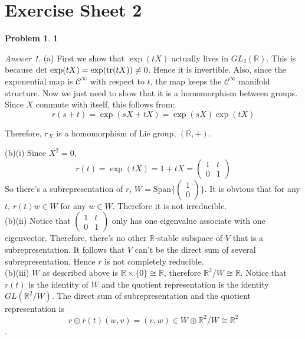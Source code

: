 \documentclass[10pt,a4paper]{article}
\theoremstyle{plain}
\theoremstyle{definition}
\newtheorem*{problem*}{Problem}
\theoremstyle{remark}
\newtheorem*{answer*}{Answer}
\newcommand{\sC}{\mathcal{C}}
\newcommand{\IR}{\mathbb{R}}
\newcommand{\tr}{\mathrm{tr}}
\renewcommand\det{{\rm det\,}}
\newcommand{\<}{\langle}
\renewcommand{\>}{\rangle}
\newcommand{\isom}{\cong}
\begin{document}
\section{Exercise Sheet 2}
\label{sec:Exercise Sheet 2}

\begin{problem*} \bfseries 1
\end{problem*}

\begin{answer*} \hfill

(a) First we show that $\exp(tX)$ actually lives in $GL_2(\IR)$. This is because $\det \exp(tX) = \exp(\tr(tX)) \not = 0$. Hence it is invertible. Also, since the exponential map is $\sC^\infty$ with respect to $t$, the map keeps the $\sC^\infty$ manifold structure. Now we just need to show that it is a homomorphism between groups.
Since $X$ commute with itself, this follows from:
\[r(s+t) = \exp(sX+tX) = \exp(sX)\exp(tX)\]

Therefore, $r_X$ is a homomorphism of Lie group, $(\IR, +)$. \\
\hfill

(b)(i) Since $X^2 = 0$, $$r(t) = \exp(tX) = 1+tX = \begin{pmatrix} 1 & t \\ 0 & 1\end{pmatrix}$$ So there's a subrepresentation of $r$, $W = \mathrm{Span}\{\begin{pmatrix}1\\0\end{pmatrix}\}$. It is obvious that for any $t$, $r(t)w\in W$ for any $w\in W$. Therefore it is not irreducible.\\

(b)(ii) Notice that $\begin{pmatrix} 1 & t \\ 0 & 1\end{pmatrix}$ only has one eigenvalue associate with one eigenvector. Therefore, there's no other $\IR$-stable subspace of $V$ that is a subrepresentation. It follows that $V$ can't be the direct sum of several subrepresentation. Hence $r$ is not completely reducible. \\

(b)(iii) $W$ as described above is $\IR\times\{0\} \cong \IR$, therefore $\IR^2/W \cong \IR$. Notice that $r(t)$ is the identity of $W$ and the quotient representation is the identity $GL(\IR^2/W)$. The direct sum of subrepresentation and the quotient representation is
\[r\oplus\bar{r}(t)(w,v) = (v,w) \in W\oplus\IR^2/W \isom\IR^2\].


\end{answer*}
\end{document}
